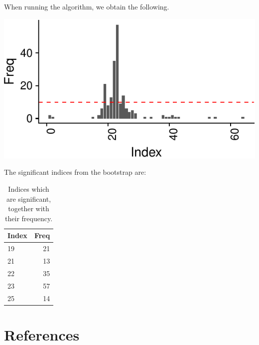 \documentclass[smallextended]{svjour3}       %
\begin{document}
When running the algorithm, we obtain the following.

\begin{center}\includegraphics{springer_template_files/figure-latex/chunk_11-1} \end{center}

The significant indices from the bootstrap are:

\begin{longtable}[t]{lr}
\caption{\label{tab:chunk_12}Indices which are significant, together with their frequency.}\\
\toprule
Index & Freq\\
\midrule
19 & 21\\
21 & 13\\
22 & 35\\
23 & 57\\
25 & 14\\
\bottomrule
\end{longtable}

\section{References}\label{references}



\end{document}
